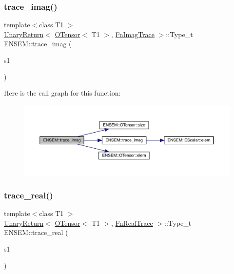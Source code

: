 \subsubsection{\texorpdfstring{trace\_imag()}{trace\_imag()}}
{\footnotesize\ttfamily template$<$class T1 $>$ \\
\mbox{\hyperlink{structENSEM_1_1UnaryReturn}{Unary\+Return}}$<$ \mbox{\hyperlink{classENSEM_1_1OTensor}{O\+Tensor}}$<$ T1 $>$, \mbox{\hyperlink{structENSEM_1_1FnImagTrace}{Fn\+Imag\+Trace}} $>$\+::Type\+\_\+t E\+N\+S\+E\+M\+::trace\+\_\+imag (\begin{DoxyParamCaption}\item[{const \mbox{\hyperlink{classENSEM_1_1OTensor}{O\+Tensor}}$<$ T1 $>$ \&}]{s1 }\end{DoxyParamCaption})\hspace{0.3cm}{\ttfamily [inline]}}

Here is the call graph for this function\+:\nopagebreak
\begin{figure}[H]
\begin{center}
\leavevmode
\includegraphics[width=350pt]{de/d87/group__obstensor_gab134dab9b5acf4d2d372b22d17d4b307_cgraph}
\end{center}
\end{figure}
\mbox{\label{group__obstensor_ga540149a8c9955de22cf6c5562ec69f2f}} 
\subsubsection{\texorpdfstring{trace\_real()}{trace\_real()}}
{\footnotesize\ttfamily template$<$class T1 $>$ \\
\mbox{\hyperlink{structENSEM_1_1UnaryReturn}{Unary\+Return}}$<$ \mbox{\hyperlink{classENSEM_1_1OTensor}{O\+Tensor}}$<$ T1 $>$, \mbox{\hyperlink{structENSEM_1_1FnRealTrace}{Fn\+Real\+Trace}} $>$\+::Type\+\_\+t E\+N\+S\+E\+M\+::trace\+\_\+real (\begin{DoxyParamCaption}\item[{const \mbox{\hyperlink{classENSEM_1_1OTensor}{O\+Tensor}}$<$ T1 $>$ \&}]{s1 }\end{DoxyParamCaption})\hspace{0.3cm}{\ttfamily [inline]}}

